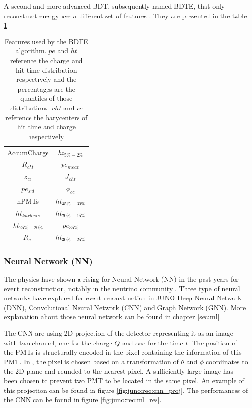 A second and more advanced BDT, subsequently named BDTE, that only reconstruct energy use a different set of features \cite{gavrikov_energy_2022}. They are presented in the table \ref{tab:juno:rec:bdte}

\begin{table}
  \centering
  \begin{tabular}{|c|c|}
    \hline
    AccumCharge &  $ht_{5\%-2\%}$ \\
    $R_{cht}$ & $pe_{mean}$ \\
    $z_{cc}$ & $J_{cht}$ \\
    $pe_{std}$ & $\phi_{cc}$ \\
    nPMTs &  $ht_{35\%-30\%}$\\
    $ht_{kurtosis}$ & $ht_{20\%-15\%}$ \\
    $ht_{25\%-20\%}$ & $pe_{35\%}$ \\
    $R_{cc}$ & $ht_{30\%-25\%}$ \\
    \hline

  \end{tabular}
  \caption{Features used by the BDTE algorithm. $pe$ and $ht$ reference the charge and hit-time distribution respectively and the percentages are the quantiles of those distributions. $cht$ and $cc$ reference the barycenters of hit time and charge respectively}
  \label{tab:juno:rec:bdte}
\end{table}

\subsubsection{Neural Network (NN)}
The physics have shown a rising for Neural Network (NN) in the past years for event reconstruction, notably in the neutrino community \cite{abbasi_graph_2022, reck_graph_2021, collaboration_convolutional_2021, dune_collaboration_neutrino_2020}. Three type of neural networks have explored for event reconstruction in JUNO Deep Neural Network (DNN), Convolutional Neural Network (CNN) and Graph Network (GNN). More explanation about those neural network can be found in chapter \ref{sec:ml}.

The CNN are using 2D projection of the detector representing it as an image with two channel, one for the charge $Q$ and one for the time $t$. The position of the PMTs is structurally encoded in the pixel containing the information of this PMT. In \cite{qian_vertex_2021}, the pixel is chosen based on a transformation of $\theta$ and $\phi$ coordinates to the 2D plane and rounded to the nearest pixel. A sufficiently large image has been chosen to prevent two PMT to be located in the same pixel. An example of this projection can be found in figure \ref{fig:juno:rec:cnn_proj}. The performances of the CNN can be found in figure \ref{fig:juno:rec:ml_res}.

